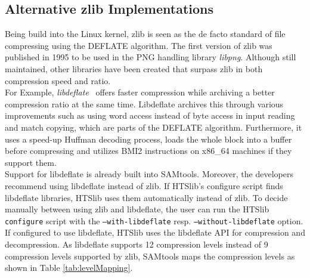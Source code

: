 \subsection{Alternative zlib Implementations}\label{altZlibs}
Being build into the Linux kernel, zlib is seen as the de facto standard of file compressing using the DEFLATE algorithm. The first version of zlib was published in 1995 to be used in the PNG handling library \textit{libpng}. Although still maintained, other libraries have been created that surpass zlib in both compression speed and ratio.\\
For Example, \textit{libdeflate}~\cite{biggers_ebiggerslibdeflate_2024} offers faster compression while archiving a better compression ratio at the same time. Libdeflate archives this through various improvements such as using word access instead of byte access in input reading and match copying, which are parts of the DEFLATE algorithm. Furthermore, it uses a speed-up Huffman decoding process, loads the whole block into a buffer before compressing and utilizes BMI2 instructions on x86\_64 machines if they support them. \\ %
Support for libdeflate is already built into SAMtools. Moreover, the developers recommend using libdeflate instead of zlib. If HTSlib's configure script finds libdeflate libraries, HTSlib uses them automatically instead of zlib. To decide manually between using zlib and libdeflate, the user can run the HTSlib \texttt{configure} script with the \texttt{--with-libdeflate} resp. \texttt{--without-libdeflate} option. If configured to use libdeflate, HTSlib uses the libdeflate API for compression and decompression. As libdeflate supports 12 compression levels instead of 9 compression levels supported by zlib, SAMtools maps the compression levels as shown in Table \ref{tab:levelMapping}. \\
